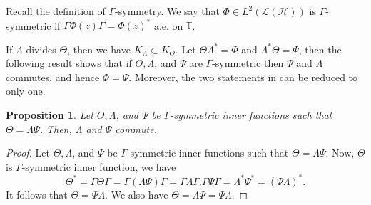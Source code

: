 \documentclass[12pt]{amsart}
\numberwithin{equation}{section}
\newcommand{\hsp}{\mathcal{H}}
\newcommand{\oL }{\mathcal{L}(\hsp) }
\newtheorem{proposition}[theorem]{Proposition}
\theoremstyle{definition}
\numberwithin{equation}{section}
\begin{document}
Recall the definition of $\Gamma$-symmetry. We say that $\Phi\in L^{2}(\oL)$ is $\Gamma$-symmetric if $\Gamma\Phi(z)\Gamma=\Phi(z)^{*}$ a.e. on $\mathbb{T}$.

\medskip

If $\Lambda$ divides $\Theta$, then we have $K_{\Lambda}\subset K_{\Theta}$. Let $\Theta\Lambda^{*}=\Phi$ and $\Lambda^{*}\Theta=\Psi$, then the following result shows that if $\Theta, \Lambda$, and $\Psi$ are $\Gamma$-symmetric then $\Psi$ and $\Lambda$ commutes, and hence $\Phi=\Psi$. Moreover, the two statements in \cite[Lemma 7.2]{CKLP} can be reduced to only one.

\begin{proposition}\label{uniq}
Let $\Theta, \Lambda$, and $\Psi$  be $\Gamma$-symmetric inner functions such that $\Theta=\Lambda\Psi$. Then, $\Lambda$ and $\Psi$ commute.
\end{proposition}
\begin{proof}
Let $\Theta, \Lambda$, and $\Psi$ be $\Gamma$-symmetric inner functions such that $\Theta=\Lambda\Psi$.
Now, $\Theta$ is $\Gamma$-symmetric inner function, we have
$$\Theta^{*}=\Gamma\Theta\Gamma=\Gamma(\Lambda\Psi)\Gamma=\Gamma\Lambda\Gamma.\Gamma\Psi\Gamma=\Lambda^{*}\Psi^{*}=(\Psi\Lambda)^{*}.$$
It follows that $\Theta=\Psi\Lambda$. We also have $\Theta=\Lambda\Psi=\Psi\Lambda$.
\end{proof}

\medskip
\end{document}
